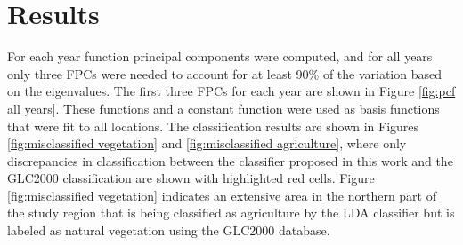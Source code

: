 %
%



\section{Results} 
For each year function principal components were computed, and for all years only three FPCs were needed to account for at least 90\% of the variation based on the eigenvalues. The first three FPCs for each year are shown in Figure \ref{fig:pcf all years}. These functions and a constant function were used as basis functions that were fit to all locations. The classification results are shown in Figures \ref{fig:misclassified vegetation} and \ref{fig:misclassified agriculture}, where only discrepancies in classification between the classifier proposed in this work and the GLC2000 classification are shown with highlighted red cells. Figure \ref{fig:misclassified vegetation} indicates an extensive area in the northern part of the study region that is being classified as agriculture by the LDA classifier but is labeled as natural vegetation using the GLC2000 database. 

